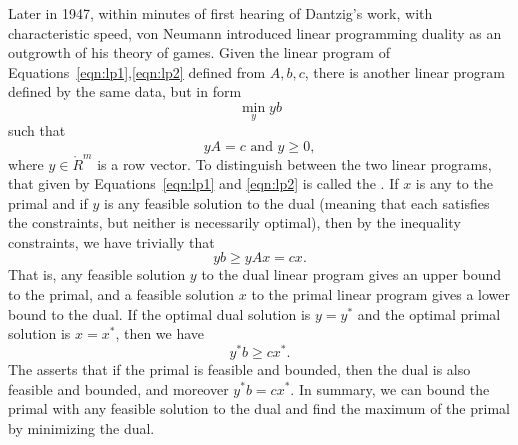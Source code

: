 Later in 1947, within minutes of first hearing of Dantzig's work, with
characteristic speed, von Neumann introduced linear programming
duality as an outgrowth of his theory of games.  Given the linear
program of Equations~\ref{eqn:lp1},\ref{eqn:lp2} defined from $A,b,c$,
there is another linear program defined by the same data, but in
 form
\begin{equation}
\min_y {y b}
\end{equation}
such that
\begin{equation}
y A = c \text{ and } y \ge 0,
\end{equation}
where $y\in\ring{R}^m$ is a row vector.  To distinguish between the two linear
programs, that given by Equations~\ref{eqn:lp1} and \ref{eqn:lp2}
is called the .  If $x$ is any  to the primal and if $y$ is any feasible solution to the
dual (meaning that each satisfies the constraints, but neither is
necessarily optimal), then by the inequality constraints, we have
trivially that
\[y b \ge y A x = c x.\]
That is, any feasible solution $y$ to the dual linear program gives an
upper bound to the primal, and a feasible solution $x$ to the primal
linear program gives a lower bound to the dual.  If the optimal dual
solution is $y=y^*$ and the optimal primal solution is $x=x^*$, then
we have
\[y^* b \ge c x^*.\]
The  asserts that if the
primal is feasible and bounded, then the dual is also feasible and
bounded, and moreover $y^* b = c x^*$.  In summary, we can bound the
primal with any feasible solution to the dual and find the maximum of
the primal by minimizing the dual.

%
%


